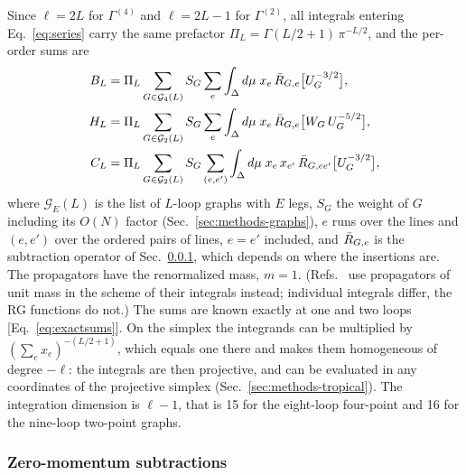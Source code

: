 Since $\ell=2L$ for $\Gamma^{(4)}$ and $\ell=2L-1$ for $\Gamma^{(2)}$, all integrals entering Eq.~\eqref{eq:series} carry the
same prefactor $\Pi_L=\Gamma(L/2+1)\,\pi^{-L/2}$, and the per-order sums are
\begin{align}
B_L&=\Pi_L\sum_{G\in\mathcal G_4(L)}S_G\sum_{e}\int_\Delta d\mu\;x_e\,
      \bar R_{G,e}\bigl[U_G^{-3/2}\bigr],\nonumber\\
H_L&=\Pi_L\sum_{G\in\mathcal G_2(L)}S_G\sum_{e}\int_\Delta d\mu\;x_e\,
      \bar R_{G,e}\bigl[W_G\,U_G^{-5/2}\bigr],\label{eq:BHC}\\
C_L&=\Pi_L\sum_{G\in\mathcal G_2(L)}S_G\sum_{(e,e')}\int_\Delta d\mu\;x_e\,x_{e'}\,
      \bar R_{G,ee'}\bigl[U_G^{-3/2}\bigr],\nonumber
\end{align}
where $\mathcal G_E(L)$ is the list of $L$-loop graphs with $E$ legs, $S_G$ the weight of $G$ including its $O(N)$
factor (Sec.~\ref{sec:methods-graphs}), $e$ runs over the lines and $(e,e')$ over the ordered pairs of lines,
$e=e'$ included, and $\bar R_{G,e}$ is the subtraction operator of Sec.~\ref{sec:methods-rbar}, which depends on where the
insertions are. The propagators have the renormalized mass, $m=1$. (Refs.~\cite{NMB1977,Ribeca2003thesis,Phi4tools2024}
use propagators of unit mass in the scheme of their integrals instead; individual integrals differ, the RG functions
do not.) The sums are known exactly at
one and two loops [Eq.~\eqref{eq:exactsums}]. On the simplex the integrands can be
multiplied by $(\sum_e x_e)^{-(L/2+1)}$, which equals one there and makes them homogeneous of degree $-\ell$: the
integrals are then projective, and can be evaluated in any coordinates of the projective simplex
(Sec.~\ref{sec:methods-tropical}). The integration dimension is $\ell-1$, that is 15 for the eight-loop four-point and 16
for the nine-loop two-point graphs.

\subsubsection{Zero-momentum subtractions}
\label{sec:methods-rbar}

